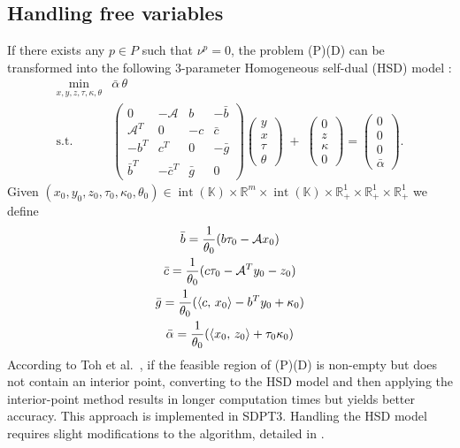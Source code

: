 \subsection{Handling free variables}
If there exists any $p \in P$ such that $\nu^p = 0$, the problem (P)(D) can be transformed into the following 3-parameter Homogeneous self-dual (HSD) model \cite{Wright1997}:
\[
  \begin{array}{cl}
   \min_{x,y,z,\tau,\kappa,\theta} & \bar{\alpha}\,\theta \\[3pt]
   \text{s.t.}
   & \begin{pmatrix}
       0 & -\mathcal{A} & b & -\bar{b}\\
       \mathcal{A}^T & 0 & -c & \bar{c}\\
       -b^T & c^T & 0 & -\bar{g}\\
       \bar{b}^T & -\bar{c}^T & \bar{g} & 0
     \end{pmatrix}
     \begin{pmatrix} y \\ x \\ \tau \\ \theta \end{pmatrix}
   \;+\;
     \begin{pmatrix} 0 \\ z \\ \kappa \\ 0 \end{pmatrix}
   =
     \begin{pmatrix} 0 \\ 0 \\ 0 \\ \bar{\alpha} \end{pmatrix}.
  \end{array}
\]
Given $(x_0,y_0,z_0,\tau_0,\kappa_0,\theta_0)\in 
  \operatorname{int}(\mathbb{K}) \times \mathbb{R}^m \times \operatorname{int}(\mathbb{K})
  \times \mathbb{R}^1_+ \times \mathbb{R}^1_+ \times \mathbb{R}^1_+$
we define
\begin{gather*}
    \bar{b} = \frac{1}{\theta_0}(b\tau_0 - \mathcal{A}x_0) \\
    \bar{c} = \frac{1}{\theta_0}(c\tau_0 - \mathcal{A}^T y_0 - z_0) \\
    \bar{g} = \frac{1}{\theta_0}(\left\langle c, \, x_0 \right\rangle - b^Ty_0 + \kappa_0) \\
    \bar{\alpha} = \frac{1}{\theta_0} (\left\langle x_0, \, z_0 \right\rangle + \tau_0 \kappa_0)
\end{gather*}
According to Toh et al.~\cite{toh1999}, if the feasible region of (P)(D) is non-empty but does not contain an interior point, converting to the HSD model and then applying the interior-point method results in longer computation times but yields better accuracy. This approach is implemented in SDPT3.  
Handling the HSD model requires slight modifications to the algorithm, detailed in \cite{toh1999}.

